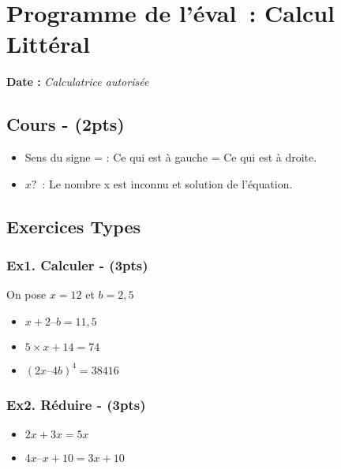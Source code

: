 



\section*{Programme de l’éval : Calcul Littéral}

\textbf{Date : } \hspace{4cm} \textit{Calculatrice autorisée}

\subsection*{Cours - (2pts)}


\begin{itemize}[label={$\bullet$}]
  \item Sens du signe = : Ce qui est à gauche = Ce qui est à droite. 
  \item $x ?$ : Le nombre x est inconnu et solution de l’équation. 
\end{itemize}

\subsection*{Exercices Types}

\subsubsection*{Ex1. Calculer - (3pts)}

On pose $x = 12$ et $b = 2,5$

\begin{itemize}[label={$\bullet$}]
  \item  $x + 2 – b = 11,5$
  \item  $5 \times x + 14 = 74$
  \item  $(2x – 4b)^4 = \SI{38416}{}$
\end{itemize}


\subsubsection*{Ex2. Réduire - (3pts)}

\begin{itemize}[label={$\bullet$}]
  \item $2x + 3x = 5x$
  \item $4x – x + 10 = 3x +10$
\end{itemize}

